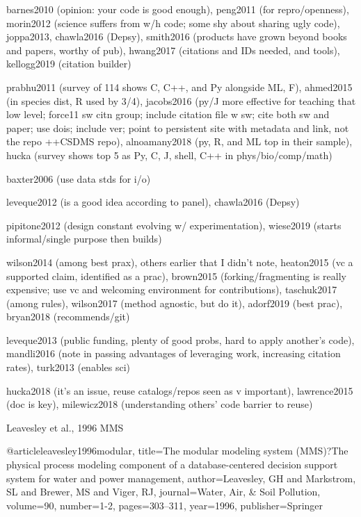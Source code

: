 \documentclass[12pt]{amsart}
\begin{document}
barnes2010 (opinion: your code is good enough), peng2011 (for repro/openness), morin2012 (science suffers from w/h code; some shy about sharing ugly code), joppa2013, chawla2016 (Depsy), smith2016 (products have grown beyond books and papers, worthy of pub), hwang2017 (citations and IDs needed, and tools), kellogg2019 (citation builder)

prabhu2011 (survey of 114 shows C, C++, and Py alongside ML, F), ahmed2015 (in species dist, R used by 3/4), jacobs2016 (py/J more effective for teaching that low level; force11 sw citn group; include citation file w sw; cite both sw and paper; use dois; include ver; point to persistent site with metadata and link, not the repo ++CSDMS repo), alnoamany2018 (py, R, and ML top in their sample), hucka (survey shows top 5 as Py, C, J, shell, C++ in phys/bio/comp/math)

baxter2006 (use data stds for i/o)

leveque2012 (is a good idea according to panel), chawla2016 (Depsy)

pipitone2012 (design constant evolving w/ experimentation), wiese2019 (starts informal/single purpose then builds)

wilson2014 (among best prax), others earlier that I didn't note, heaton2015 (vc a supported claim, identified as a prac), brown2015 (forking/fragmenting is really expensive; use vc and welcoming environment for contributions), taschuk2017 (among rules), wilson2017 (method agnostic, but do it), adorf2019 (best prac), bryan2018 (recommends/git)

leveque2013 (public funding, plenty of good probs, hard to apply another's code), mandli2016 (note in passing advantages of leveraging work, increasing citation rates), turk2013 (enables sci)

hucka2018 (it's an issue, reuse catalogs/repos seen as v important), lawrence2015 (doc is key), milewicz2018 (understanding others' code barrier to reuse)


Leavesley et al., 1996 MMS

@article{leavesley1996modular,
  title={The modular modeling system (MMS)?The physical process modeling component of a database-centered decision support system for water and power management},
  author={Leavesley, GH and Markstrom, SL and Brewer, MS and Viger, RJ},
  journal={Water, Air, \& Soil Pollution},
  volume={90},
  number={1-2},
  pages={303--311},
  year={1996},
  publisher={Springer}
}
\end{document}

